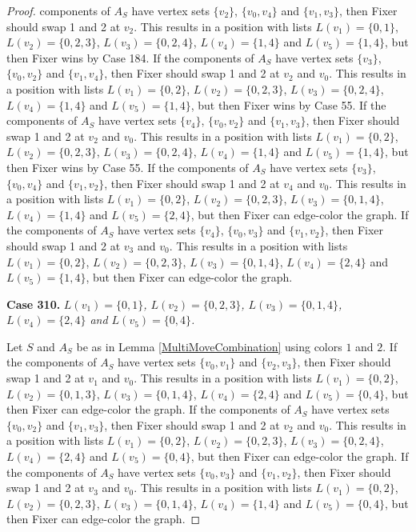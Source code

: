 \documentclass[12pt]{amsart}
\theoremstyle{plain}
\theoremstyle{definition}
\theoremstyle{remark}
\begin{document}
\begin{proof}
components of $A_S$ have vertex sets $\{v_2\}$, $\{v_0, v_4\}$ and $\{v_1, v_3\}$, then Fixer should swap 1 and 2 at $v_2$. This results in a position with lists $L(v_1) = \{0, 1\}$, $L(v_2) = \{0, 2, 3\}$, $L(v_3) = \{0, 2, 4\}$, $L(v_4) = \{1, 4\}$ and $L(v_5) = \{1, 4\}$, but then Fixer wins by Case 184. If the components of $A_S$ have vertex sets $\{v_3\}$, $\{v_0, v_2\}$ and $\{v_1, v_4\}$, then Fixer should swap 1 and 2 at $v_2$ and $v_0$. This results in a position with lists $L(v_1) = \{0, 2\}$, $L(v_2) = \{0, 2, 3\}$, $L(v_3) = \{0, 2, 4\}$, $L(v_4) = \{1, 4\}$ and $L(v_5) = \{1, 4\}$, but then Fixer wins by Case 55. If the components of $A_S$ have vertex sets $\{v_4\}$, $\{v_0, v_2\}$ and $\{v_1, v_3\}$, then Fixer should swap 1 and 2 at $v_2$ and $v_0$. This results in a position with lists $L(v_1) = \{0, 2\}$, $L(v_2) = \{0, 2, 3\}$, $L(v_3) = \{0, 2, 4\}$, $L(v_4) = \{1, 4\}$ and $L(v_5) = \{1, 4\}$, but then Fixer wins by Case 55. If the components of $A_S$ have vertex sets $\{v_3\}$, $\{v_0, v_4\}$ and $\{v_1, v_2\}$, then Fixer should swap 1 and 2 at $v_4$ and $v_0$. This results in a position with lists $L(v_1) = \{0, 2\}$, $L(v_2) = \{0, 2, 3\}$, $L(v_3) = \{0, 1, 4\}$, $L(v_4) = \{1, 4\}$ and $L(v_5) = \{2, 4\}$, but then Fixer can edge-color the graph. If the components of $A_S$ have vertex sets $\{v_4\}$, $\{v_0, v_3\}$ and $\{v_1, v_2\}$, then Fixer should swap 1 and 2 at $v_3$ and $v_0$. This results in a position with lists $L(v_1) = \{0, 2\}$, $L(v_2) = \{0, 2, 3\}$, $L(v_3) = \{0, 1, 4\}$, $L(v_4) = \{2, 4\}$ and $L(v_5) = \{1, 4\}$, but then Fixer can edge-color the graph. 

\noindent\textbf{Case 310.  }\textit{$L(v_1) = \{0, 1\}$, $L(v_2) = \{0, 2, 3\}$, $L(v_3) = \{0, 1, 4\}$, $L(v_4) = \{2, 4\}$ and $L(v_5) = \{0, 4\}$.}

Let $S$ and $A_S$ be as in Lemma \ref{MultiMoveCombination} using colors $1$ and $2$. If the components of $A_S$ have vertex sets $\{v_0, v_1\}$ and $\{v_2, v_3\}$, then Fixer should swap 1 and 2 at $v_1$ and $v_0$. This results in a position with lists $L(v_1) = \{0, 2\}$, $L(v_2) = \{0, 1, 3\}$, $L(v_3) = \{0, 1, 4\}$, $L(v_4) = \{2, 4\}$ and $L(v_5) = \{0, 4\}$, but then Fixer can edge-color the graph. If the components of $A_S$ have vertex sets $\{v_0, v_2\}$ and $\{v_1, v_3\}$, then Fixer should swap 1 and 2 at $v_2$ and $v_0$. This results in a position with lists $L(v_1) = \{0, 2\}$, $L(v_2) = \{0, 2, 3\}$, $L(v_3) = \{0, 2, 4\}$, $L(v_4) = \{2, 4\}$ and $L(v_5) = \{0, 4\}$, but then Fixer can edge-color the graph. If the components of $A_S$ have vertex sets $\{v_0, v_3\}$ and $\{v_1, v_2\}$, then Fixer should swap 1 and 2 at $v_3$ and $v_0$. This results in a position with lists $L(v_1) = \{0, 2\}$, $L(v_2) = \{0, 2, 3\}$, $L(v_3) = \{0, 1, 4\}$, $L(v_4) = \{1, 4\}$ and $L(v_5) = \{0, 4\}$, but then Fixer can edge-color the graph. 


\end{proof}
\end{document}
